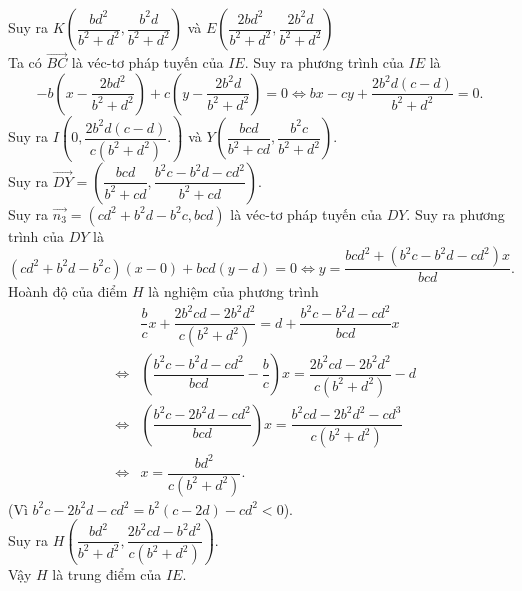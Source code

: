 \begin{bt}
{		Suy ra $K\left( \dfrac{bd^2}{b^2 + d^2}, \dfrac{b^2d}{b^2 + d^2} \right)$ và $E\left( \dfrac{2bd^2}{b^2 + d^2}, \dfrac{2b^2d}{b^2 + d^2} \right)$ \\
		Ta có $\overrightarrow{BC}$ là véc-tơ pháp tuyến của $IE$. Suy ra phương trình của $IE$ là
		\[ -b\left( x - \dfrac{2bd^2}{b^2 + d^2} \right) + c\left( y - \dfrac{2b^2d}{b^2 + d^2} \right) = 0 \Leftrightarrow bx - cy + \dfrac{2b^2d(c-d)}{b^2 + d^2} = 0. \]
		Suy ra $I\left( 0, \dfrac{2b^2d(c-d)}{c(b^2 + d^2)}. \right)$ và $Y\left( \dfrac{bcd}{b^2 + cd}, \dfrac{b^2c}{b^2 + d^2} \right)$. \\
		Suy ra $\overrightarrow{DY} = \left( \dfrac{bcd}{b^2 + cd}, \dfrac{b^2c - b^2d - cd^2}{b^2 + cd} \right)$. \\
		Suy ra $\overrightarrow{n_3} = (cd^2 + b^2d - b^2c, bcd)$ là véc-tơ  pháp tuyến của $DY$. Suy ra phương trình của $DY$ là
		\[ (cd^2 + b^2d - b^2c)(x - 0) + bcd(y - d) = 0 \Leftrightarrow y = \dfrac{bcd^2 + (b^2c - b^2d - cd^2)x}{bcd}. \]
		Hoành độ của điểm $H$ là nghiệm của phương trình
		\begin{eqnarray*}
			& & \dfrac{b}{c}x + \dfrac{2b^2cd - 2b^2d^2}{c(b^2 + d^2)} = d + \dfrac{b^2c - b^2d - cd^2}{bcd}x \\
			&\Leftrightarrow & \left( \dfrac{b^2c - b^2d - cd^2}{bcd} - \dfrac{b}{c} \right)x = \dfrac{2b^2cd - 2b^2d^2}{c(b^2 + d^2)} - d \\
			&\Leftrightarrow & \left( \dfrac{b^2c - 2b^2d - cd^2}{bcd} \right)x = \dfrac{b^2cd - 2b^2d^2 - cd^3}{c(b^2 + d^2)} \\
			&\Leftrightarrow & x = \dfrac{bd^2}{c(b^2 + d^2)}.
		\end{eqnarray*}
		(Vì $b^2c - 2b^2d - cd^2 = b^2(c-2d) - cd^2 < 0$). \\
		Suy ra $H\left( \dfrac{bd^2}{b^2 + d^2}, \dfrac{2b^2cd - b^2d^2}{c(b^2 + d^2)} \right)$. \\
		Vậy $H$ là trung điểm của $IE$.
	}
\end{bt}

